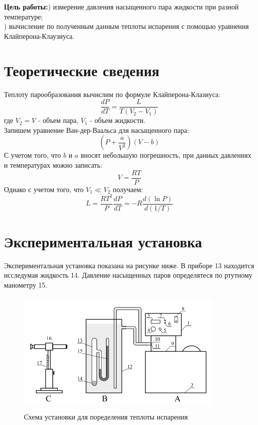 \textbf{Цель работы:}) измерение давления насыщенного пара жидкости при разной температуре;\\) вычисление по полученным данным теплоты испарения с помощью уравнения 
Клайперона-Клаузиуса. \\\indent 

\section*{Теоретические сведения}
Теплоту парообразования вычислим по формуле Клайперона-Клазиуса:
\begin{equation}
    \frac{dP}{dT} = \frac{L}{T(V_2 - V_1)}
\end{equation}
где $V_2 = V$ - объем пара, $V_1$ - объем жидкости.\\\indent
Запишем уравнение Ван-дер-Ваальса для насыщенного пара:
\begin{equation}
    \left ( P + \frac{a}{V^2}\right )(V - b)
\end{equation}
С учетом того, что $b$ и $a$ вносят небольшую погрешность, 
при данных давлениях и температурах можно записать:
\begin{equation}
    V = \frac{RT}{P}
\end{equation}
Однако с учетом того, что $V_1 \ll V_2$ получаем:
\begin{equation}
    L = \frac{RT^2}{P}\frac{dP}{dT} = -R\frac{d(\ln P)}{d(1/T)}
\end{equation}

\section*{Экспериментальная установка}
Экспериментальная установка показана на рисунке ниже. В приборе 13 находится 
исследумая жидкость 14. Давление насыщенных паров определятеся по 
ртутному манометру 15. 
\begin{figure}[h!]
    \centering
    \includegraphics[width=10cm,height=6cm]{setup.png}
    \caption{Схема установки для поределения теплоты испарения}
    \label{fig:setup}
\end{figure}



